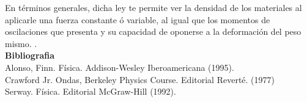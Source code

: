 \documentclass[11pt,a4paper]{article}
\begin{document}
\begin{multicols}{2}
En términos generales, dicha ley te permite ver la densidad de los materiales al aplicarle una fuerza constante ó variable, al igual que los momentos de oscilaciones que presenta y su capacidad de oponerse a la deformación del  peso mismo.
.\\
\textbf{{\normalsize Bibliografia}}\\
Alonso, Finn. Física. Addison-Wesley Iberoamericana (1995).\\
Crawford Jr. Ondas, Berkeley Physics Course. Editorial Reverté. (1977)\\
Serway. Física. Editorial McGraw-Hill (1992).\\

\end{multicols}
\end{document}
